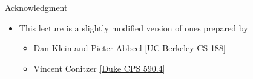 \documentclass[11pt,aspectratio=169]{beamer}
\begin{document}
  
  \begin{frame}{Acknowledgment}
   \begin{itemize}
   \setlength{\itemsep}{1em}
    \item This lecture is a slightly modified version of ones prepared by
    \begin{itemize}
     \item Dan Klein and Pieter Abbeel \href{http://ai.berkeley.edu/home.html}{[UC Berkeley CS 188]}
     \item Vincent Conitzer \href{https://courses.cs.duke.edu/spring16/compsci590.4/}{[Duke CPS 590.4]}
    \end{itemize}
   \end{itemize}
  \end{frame}
\end{document}
